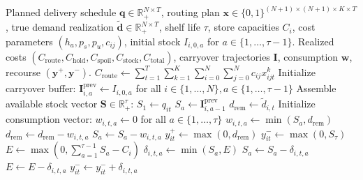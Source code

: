 \documentclass[11pt,a4paper]{article}
\theoremstyle{definition}
\theoremstyle{remark}
\begin{document}
\begin{algorithm}[H]
\caption{Post-Decision FIFO Perishable Inventory Evaluation Simulator}
\label{alg:fifo_simulator}
\begin{algorithmic}[1]
\Require Planned delivery schedule $\mathbf{q} \in \mathbb{R}_+^{N \times T}$, routing plan $\mathbf{x} \in \{0, 1\}^{(N+1) \times (N+1) \times K \times T}$, true demand realization $\tilde{\mathbf{d}} \in \mathbb{R}_+^{N \times T}$, shelf life $\tau$, store capacities $C_i$, cost parameters $(h_a, p_s, p_u, c_{ij})$, initial stock $I_{i,0,a}$ for $a \in \{1, \dots, \tau-1\}$.
\Ensure Realized costs $(C_{\text{route}}, C_{\text{hold}}, C_{\text{spoil}}, C_{\text{stock}}, C_{\text{total}})$, carryover trajectories $\mathbf{I}$, consumption $\mathbf{w}$, recourse $(\mathbf{y}^+, \mathbf{y}^-)$.
\State $C_{\text{route}} \gets \sum_{t=1}^T \sum_{k=1}^K \sum_{i=0}^N \sum_{j=0}^N c_{ij} x_{ijt}^k$
\State Initialize carryover buffer: $\mathbf{I}^{\text{prev}}_{i, a} \gets I_{i,0,a}$ for all $i \in \{1, \dots, N\}, a \in \{1, \dots, \tau-1\}$
        \State Assemble available stock vector $\mathbf{S} \in \mathbb{R}_+^\tau$:
        \State $S_1 \gets q_{it}$ 
            \State $S_a \gets \mathbf{I}^{\text{prev}}_{i, a-1}$ 
        \EndFor
        \State $d_{\text{rem}} \gets \tilde{d}_{i,t}$
        \State Initialize consumption vector: $w_{i,t,a} \gets 0$ for all $a \in \{1, \dots, \tau\}$
                \State $w_{i,t,a} \gets \min(S_a, d_{\text{rem}})$
                \State $d_{\text{rem}} \gets d_{\text{rem}} - w_{i,t,a}$
                \State $S_a \gets S_a - w_{i,t,a}$
            \EndIf
        \EndFor
        \State {}
        \State $y_{it}^+ \gets \max(0, d_{\text{rem}})$ 
        \State $y_{it}^- \gets \max(0, S_\tau)$ 
        \State $E \gets \max(0, \sum_{a=1}^{\tau-1} S_a - C_i)$
            \State $\delta_{i,t,a} \gets \min(S_a, E)$ 
            \State $S_a \gets S_a - \delta_{i,t,a}$
            \State $E \gets E - \delta_{i,t,a}$
            \State $y_{it}^- \gets y_{it}^- + \delta_{i,t,a}$

\end{algorithmic}
\end{algorithm}
\end{document}

